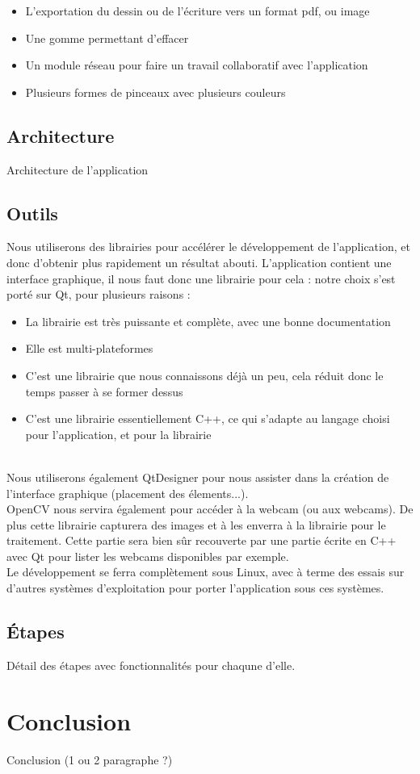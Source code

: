 \documentclass{article}
\begin{document}
		\begin{itemize}
		\item L'exportation du dessin ou de l'écriture vers un format pdf, ou image
		\item Une gomme permettant d'effacer	
		\item Un module réseau pour faire un travail collaboratif avec l'application
		\item Plusieurs formes de pinceaux avec plusieurs couleurs
		\end{itemize}

		\subsection{Architecture}
			Architecture de l'application
		\subsection{Outils}
			Nous utiliserons des librairies pour accélérer le développement de l'application, et donc d'obtenir plus 
rapidement un résultat abouti.
		L'application contient une interface graphique, il nous faut donc une librairie pour cela :
		notre choix s'est porté sur Qt, pour plusieurs raisons : 
		\begin{itemize}
		\item La librairie est très puissante et complète, avec une bonne documentation
		\item Elle est multi-plateformes
		\item C'est une librairie que nous connaissons déjà un peu, cela réduit donc le temps passer à se former dessus
		\item C'est une librairie essentiellement C++, ce qui s'adapte au langage choisi pour l'application, et pour la librairie
		\end{itemize} \ \\
Nous utiliserons également QtDesigner pour nous assister dans la création de l'interface graphique (placement des élements...). \\
		
OpenCV nous servira également pour accéder à la webcam (ou aux webcams). De plus cette librairie capturera des 
images et à les enverra à la librairie pour le traitement. Cette partie sera bien sûr recouverte par une partie écrite en C++ avec Qt pour lister les webcams disponibles par exemple. \\

		Le développement se ferra complètement sous Linux, avec à terme des essais sur d'autres systèmes d'exploitation pour
porter l'application sous ces systèmes. \\ 

		\subsection{Étapes}
			Détail des étapes avec fonctionnalités pour chaqune d'elle.
	\section{Conclusion}	
		Conclusion (1 ou 2 paragraphe ?)
	
\end{document}
